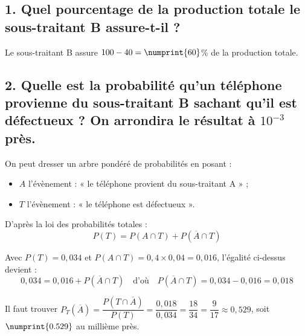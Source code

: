 \subsection*{1. Quel pourcentage de la production totale le sous-traitant B assure-t-il ?}
	
	Le sous-traitant B assure $100 - 40 = \numprint{60}$\% de la production totale.
	
	\subsection*{2. Quelle est la probabilité qu'un téléphone provienne du sous-traitant B sachant qu'il est défectueux ? On arrondira le résultat à $10^{-3}$ près.}
	
	On peut dresser un arbre pondéré de probabilités en posant :
	\begin{itemize}
		\item $A$ l'évènement : « le téléphone provient du sous-traitant A » ;
		\item $T$ l'évènement : « le téléphone est défectueux ».
	\end{itemize}
	
	
	D'après la loi des probabilités totales :
	\[
	P(T) = P(A \cap T) + P(\overline{A} \cap T)
	\]
	
	Avec $P(T) = 0,034$ et $P(A \cap T) = 0,4 \times 0,04 = 0,016$, l'égalité ci-dessus devient :
	\[
	0,034 = 0,016 + P(\overline{A} \cap T) \quad \text{d'où} \quad P(\overline{A} \cap T) = 0,034 - 0,016 = 0,018
	\]
	
	Il faut trouver $P_T(\overline{A}) = \dfrac{P(T \cap \overline{A})}{P(T)} = \dfrac{0,018}{0,034} = \dfrac{18}{34} = \dfrac{9}{17} \approx 0,529$, soit $\numprint{0.529}$ au millième près.
